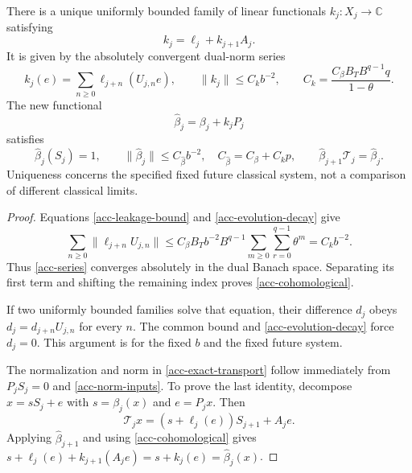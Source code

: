 \begin{theorem}
\label{acc-adapted-theorem}
There is a unique uniformly bounded family of linear
functionals $k_j:X_j\to\mathbb C$ satisfying
\begin{equation}
                         k_j=\ell_j+k_{j+1}A_j.
 \label{acc-cohomological}
\end{equation}
It is given by the absolutely convergent dual-norm series
\begin{equation}
                k_j(e)=\sum_{n\ge0}\ell_{j+n}(U_{j,n}e),
 \qquad
 \|k_j\|\le C_kb^{-2},\qquad
 C_k=\frac{C_\beta B_T B^{q-1}q}{1-\theta}.
 \label{acc-series}
\end{equation}
The new functional
\begin{equation}
                  \widehat\beta_j=\beta_j+k_jP_j
 \label{acc-adapted-beta}
\end{equation}
satisfies
\begin{equation}
 \widehat\beta_j(S_j)=1,\qquad
 \|\widehat\beta_j\|\le C_{\widehat\beta}b^{-2},
 \quad C_{\widehat\beta}=C_\beta+C_kp,\qquad
 \widehat\beta_{j+1}\mathcal T_j=\widehat\beta_j.
 \label{acc-exact-transport}
\end{equation}
Uniqueness concerns the specified fixed future classical
system, not a comparison of different classical limits.
\end{theorem}
\begin{proof}
Equations \eqref{acc-leakage-bound} and
\eqref{acc-evolution-decay} give
\[
 \sum_{n\ge0}\|\ell_{j+n}U_{j,n}\|
 \le C_\beta B_Tb^{-2}B^{q-1}
                 \sum_{m\ge0}\sum_{r=0}^{q-1}\theta^m
 =C_kb^{-2}.
\]
Thus \eqref{acc-series} converges absolutely in the dual
Banach space. Separating its first term and shifting the
remaining index proves \eqref{acc-cohomological}.

If two uniformly bounded families solve that equation,
their difference $d_j$ obeys
$d_j=d_{j+n}U_{j,n}$ for every $n$.
The common bound and \eqref{acc-evolution-decay} force
$d_j=0$. This argument is for the fixed $b$ and the
fixed future system.

The normalization and norm in \eqref{acc-exact-transport}
follow immediately from $P_jS_j=0$ and
\eqref{acc-norm-inputs}. To prove the last identity,
decompose $x=sS_j+e$ with $s=\beta_j(x)$ and $e=P_jx$.
Then
\begin{equation}
 \mathcal T_jx=(s+\ell_j(e))S_{j+1}+A_je.
 \label{acc-classical-decomposition}
\end{equation}
Applying $\widehat\beta_{j+1}$ and using
\eqref{acc-cohomological} gives
$s+\ell_j(e)+k_{j+1}(A_je)=s+k_j(e)
=\widehat\beta_j(x)$.
\end{proof}

